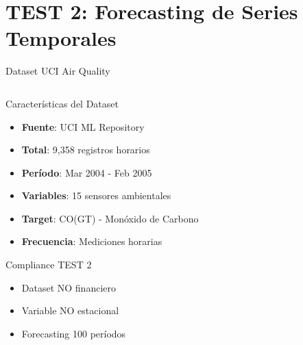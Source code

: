 \documentclass[aspectratio=169]{beamer}
\begin{document}
\section{TEST 2: Forecasting de Series Temporales}

\begin{frame}{Dataset UCI Air Quality}
    \begin{columns}[T]
        \begin{column}{0.6\textwidth}
            \begin{block}{Características del Dataset}
                \begin{itemize}
                    \item \textbf{Fuente}: UCI ML Repository
                    \item \textbf{Total}: 9,358 registros horarios
                    \item \textbf{Período}: Mar 2004 - Feb 2005
                    \item \textbf{Variables}: 15 sensores ambientales
                    \item \textbf{Target}: CO(GT) - Monóxido de Carbono
                    \item \textbf{Frecuencia}: Mediciones horarias
                \end{itemize}
            \end{block}
            
            \begin{exampleblock}{Compliance TEST 2}
                \begin{itemize}
                    \item \textcolor{green}{\checkmark} Dataset NO financiero
                    \item \textcolor{green}{\checkmark} Variable NO estacional
                    \item \textcolor{green}{\checkmark} Forecasting 100 períodos
                \end{itemize}
            \end{exampleblock}
        \end{column}
        

\end{columns}
\end{frame}
\end{document}
